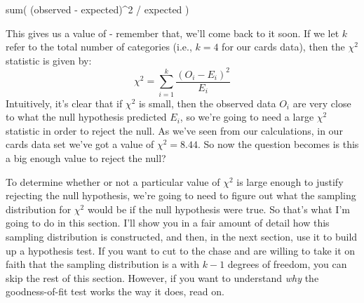 \begin{rblock1}
sum( (observed - expected)^2 / expected )
\end{rblock1}

This gives us a value of  - remember that, we'll come back to it soon. If we let $k$ refer to the total number of categories (i.e., $k=4$ for our cards data), then the $\chi^2$ statistic is given by:
$$
\chi^2 = \sum_{i=1}^k \frac{(O_i - E_i)^2}{E_i}
$$
Intuitively, it's clear that if $\chi^2$ is small, then the observed data $O_i$ are very close to what the null hypothesis predicted $E_i$, so we're going to need a large $\chi^2$ statistic in order to reject the null. As we've seen from our calculations, in our cards data set we've got a value of $\chi^2 = 8.44$. So now the question becomes is this a big enough value to reject the null?


To determine whether or not a particular value of $\chi^2$ is large enough to justify rejecting the null hypothesis, we're going to need to figure out what the sampling distribution for $\chi^2$ would be if the null hypothesis were true. So that's what I'm going to do in this section. I'll show you in a fair amount of detail how this sampling distribution is constructed, and then, in the next section, use it to build up a hypothesis test. If you want to cut to the chase and are willing to take it on faith that the sampling distribution is a  with $k-1$ degrees of freedom, you can skip the rest of this section. However, if you want to understand {\it why} the goodness-of-fit test works the way it does, read on.


